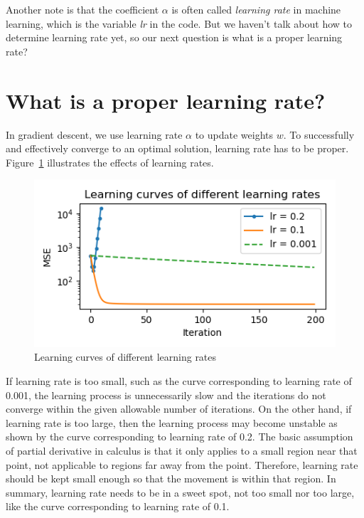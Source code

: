 \documentclass[
	letterpaper
]{article}
\begin{document}
Another note is that the coefficient $\alpha$ is often called \textit{learning rate} in machine learning, which is the variable \textit{lr} in the code. But we haven't talk about how to determine learning rate yet, so our next question is what is a proper learning rate?

\section{What is a proper learning rate?}
In gradient descent, we use learning rate $\alpha$ to update weights $w$.
To successfully and effectively converge to an optimal solution, learning rate has to be proper.
Figure~\ref{fig:difflr} illustrates the effects of learning rates.
\begin{figure}[htbp]
	\centering
	\includegraphics[width=4.2 in]{figures/diff_learning_rates.png}
	\caption{Learning curves of different learning rates}
	\label{fig:difflr}
\end{figure}

If learning rate is too small, such as the curve corresponding to learning rate of 0.001, the learning process is unnecessarily slow and the iterations do not converge within the given allowable number of iterations.
On the other hand, if learning rate is too large, then the learning process may become unstable as shown by the curve corresponding to learning rate of 0.2.
The basic assumption of partial derivative in calculus is that it only applies to a small region near that point, not applicable to regions far away from the point.
Therefore, learning rate should be kept small enough so that the movement is within that region.
In summary, learning rate needs to be in a sweet spot, not too small nor too large, like the curve corresponding to learning rate of 0.1.
\end{document}
